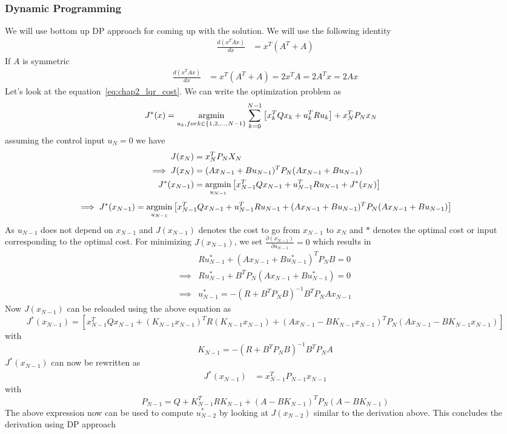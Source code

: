\subsubsection{Dynamic Programming}
We will use bottom up DP approach for coming up with the solution.
We will use the following identity 
\begin{align}
    \frac{d(x^TAx)}{dx} &= x^T(A^T+A)
\end{align}
If $A$ is symmetric
\begin{align}
    \frac{d(x^TAx)}{dx} &= x^T(A^T+A)=2x^TA=2A^Tx=2Ax
\end{align}
Let's look at the equation~\ref{eq:chap2_lqr_cost}. We can write the optimization problem as
\begin{align}
    J^*(x) &= \argmin_{u_k, for k \in \{1, 2, ..., N-1\}}\sum_{k=0}^{N-1}\left[x_k^TQx_k + u_k^TRu_k \right] + x^T_NP_Nx_N \label{eq:chap2_lqr_deriv_cost}
\end{align}
assuming the control input $u_N=0$
we have
\begin{align}
    J(x_{N}) &= x_N^TP_NX_N \\
    \implies J(x_N) &= (Ax_{N-1}+Bu_{N-1})^TP_N(Ax_{N-1}+Bu_{N-1})\\
    J^*(x_{N-1}) &= \operatorname*{argmin}_{u_{N-1}}\left[x_{N-1}^TQx_{N-1} + u_{N-1}^TRu_{N-1} + J^*(x_N)\right] \\
\end{align}
\begin{dmath*}
    \implies J^*(x_{N-1}) = \argmin_{u_{N-1}}\left[x_{N-1}^TQx_{N-1} + u_{N-1}^TRu_{N-1} +  (Ax_{N-1}+Bu_{N-1})^TP_N(Ax_{N-1}+Bu_{N-1})\right]
\end{dmath*}
As $u_{N-1}$ does not depend on $x_{N-1}$ and $J(x_{N-1})$ denotes the cost to go from $x_{N-1}$ to $x_{N}$ and $*$ denotes the optimal cost or input corresponding to the optimal cost.
For minimizing $J(x_{N-1})$, we set $\frac{\partial (x_{N-1})}{\partial u_{N-1}} = 0$ which results in
\begin{align}
    & Ru^*_{N-1} + (Ax_{N-1}+Bu^*_{N-1})^TP_NB = 0 \\
    \implies & Ru^*_{N-1} + B^TP_N(Ax_{N-1}+Bu^*_{N-1}) = 0 \\
    \implies & u^*_{N-1} = -(R+B^TP_NB)^{-1}B^TP_NAx_{N-1}
\end{align}
Now $J(x_{N-1})$ can be reloaded using the above equation as
\begin{dmath*}
    J^*(x_{N-1}) = \left[x_{N-1}^TQx_{N-1} + (K_{N-1}x_{N-1})^TR(K_{N-1}x_{N-1}) + (Ax_{N-1}-BK_{N-1}x_{N-1})^TP_N(Ax_{N-1}-BK_{N-1}x_{N-1})\right]
\end{dmath*}
with $$K_{N-1} = -(R+B^TP_NB)^{-1}B^TP_NA$$
$J^*(x_{N-1})$ can now be rewritten as 
\begin{align}
    J^*(x_{N-1}) &= x_{N-1}^TP_{N-1}x_{N-1}
\end{align}
with
$$P_{N-1}= Q+K^T_{N-1}RK_{N-1}+(A-BK_{N-1})^TP_{N}(A-BK_{N-1})$$
The above expression now can be used to compute $u^*_{N-2}$ by looking at $J(x_{N-2})$ similar to the derivation above.
This concludes the derivation using DP approach
